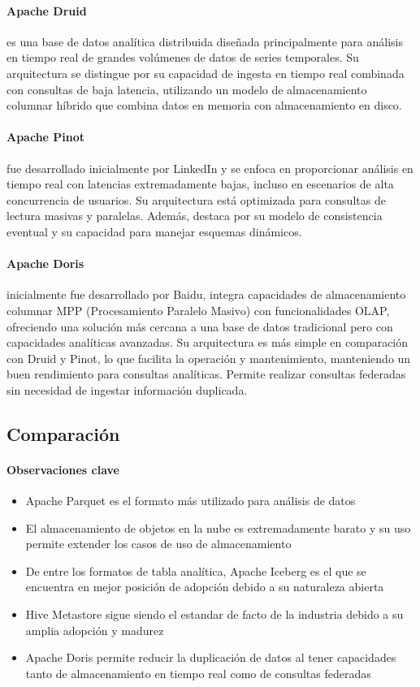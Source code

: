 \paragraph{Apache Druid}
es una base de datos analítica distribuida diseñada principalmente para análisis en tiempo real de grandes volúmenes de datos de series temporales. 
Su arquitectura se distingue por su capacidad de ingesta en tiempo real combinada con consultas de baja latencia, 
utilizando un modelo de almacenamiento columnar híbrido que combina datos en memoria con almacenamiento en disco. 

\paragraph{Apache Pinot} 
fue desarrollado inicialmente por LinkedIn y se enfoca en proporcionar análisis en tiempo real con latencias extremadamente bajas, 
incluso en escenarios de alta concurrencia de usuarios. 
Su arquitectura está optimizada para consultas de lectura masivas y paralelas. 
Además, destaca por su modelo de consistencia eventual y su capacidad para manejar esquemas dinámicos.

\paragraph{Apache Doris} 
inicialmente fue desarrollado por Baidu, integra capacidades de almacenamiento columnar MPP (Procesamiento Paralelo Masivo) con funcionalidades OLAP, 
ofreciendo una solución más cercana a una base de datos tradicional pero con capacidades analíticas avanzadas. 
Su arquitectura es más simple en comparación con Druid y Pinot, lo que facilita la operación y mantenimiento, manteniendo un buen rendimiento para consultas analíticas.
Permite realizar consultas federadas sin necesidad de ingestar información duplicada.

\newpage

\subsection{Comparación}

\paragraph{Observaciones clave}
\begin{itemize}
    \item Apache Parquet es el formato más utilizado para análisis de datos
    \item El almacenamiento de objetos en la nube es extremadamente barato y su uso permite extender los casos de uso de almacenamiento
    \item De entre los formatos de tabla analítica, Apache Iceberg es el que se encuentra en mejor posición de adopción debido a su naturaleza abierta
    \item Hive Metastore sigue siendo el estandar de facto de la industria debido a su amplia adopción y madurez
    \item Apache Doris permite reducir la duplicación de datos al tener capacidades tanto de almacenamiento en tiempo real como de consultas federadas
\end{itemize}
\newpage